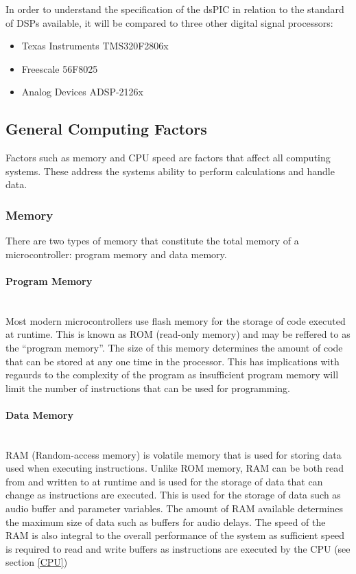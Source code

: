 \documentclass{scrartcl}
\begin{document}
    In order to understand the specification of the dsPIC in relation to the
    standard of DSPs available, it will be compared to three other digital signal
    processors:
    \begin{itemize}
        \item Texas Instruments TMS320F2806x
        \item Freescale 56F8025
        \item Analog Devices ADSP-2126x
    \end{itemize}

    \subsection{General Computing Factors}
    Factors such as memory and CPU speed are factors that affect all computing
    systems. These address the systems ability to perform calculations and
    handle data.

    \subsubsection{Memory}
    There are two types of memory that constitute the total memory of a
    microcontroller: program memory and data memory.

    \paragraph{Program Memory}~\\
    Most modern microcontrollers use flash memory for the storage of code
    executed at runtime. This is known as ROM (read-only memory) and may be
    reffered to as the ``program memory''. The size of this memory determines
    the amount of code that can be stored at any one time in the processor.
    This has implications with regaurds to the complexity of the program as
    insufficient program memory will limit the number of instructions that can
    be used for programming.

    \paragraph{Data Memory}~\\
    RAM (Random-access memory) is volatile memory that is used for storing data
    used when executing instructions. Unlike ROM memory, RAM can be both read
    from and written to at runtime and is used for the storage of data that can
    change as instructions are executed. This is used for the storage of data
    such as audio buffer and parameter variables. The amount of RAM available
    determines the maximum size of data such as buffers for audio delays. The
    speed of the RAM is also integral to the overall performance of the system
    as sufficient speed is required to read and write buffers as instructions
    are executed by the CPU (see section \ref{CPU})
\end{document}
